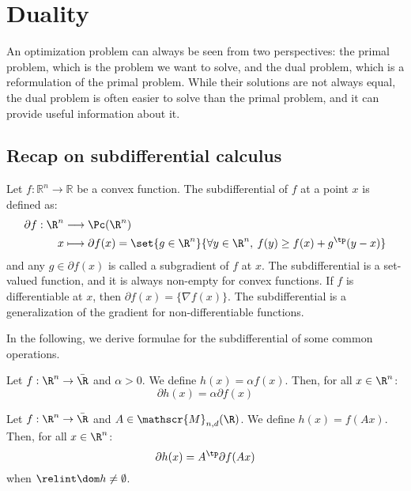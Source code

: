 \section{Duality}
An optimization problem can always be seen from two perspectives: the primal problem, which is the problem we want to solve, and the dual problem, which is a reformulation of the primal problem. While their solutions are not always equal, the dual problem is often easier to solve than the primal problem, and it can provide useful information about it.
\subsection{Recap on subdifferential calculus}
Let $f:\mathbb{R}^n\to\mathbb{R}$ be a convex function. The subdifferential of $f$ at a point $x$ is defined as:
\begin{align*}
    \partial f : \R^n &\longrightarrow \Pc(\R^n)\\
    x &\longmapsto \partial f(x) = \set{g\in\R^n}{\forall y\in\R^n, \: f(y)\geq f(x)+g^\tp(y-x)}
\end{align*}
and any $g\in\partial f(x)$ is called a subgradient of $f$ at $x$. The subdifferential is a set-valued function, and it is always non-empty for convex functions. If $f$ is differentiable at $x$, then $\partial f(x) = \{\nabla f(x)\}$. The subdifferential is a generalization of the gradient for non-differentiable functions.

In the following, we derive formulae for the subdifferential of some common operations.

\begin{property}
    Let $f:\R^n\to\bar{\R}$ and $\alpha>0$. We define $h(x)=\alpha f(x)$. Then, for all $x\in\R^n$:
    \begin{equation*}
        \partial h(x) = \alpha\partial f(x)
    \end{equation*}
\end{property}

\begin{property}
    Let $f:\R^n\to\bar{\R}$ and $A\in\mathscr{M}_{n, d}(\R)$. We define $h(x)=f(Ax)$. Then, for all $x\in\R^n$:
    \begin{equation*}
        \partial h(x) = A^\tp\partial f(Ax)
    \end{equation*}
    when $\relint\dom h\neq\emptyset$.
\end{property}

